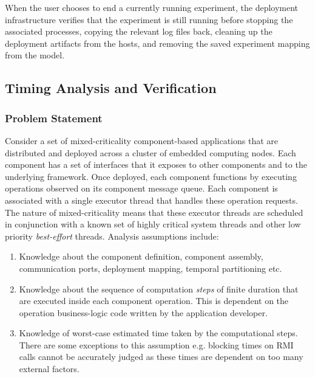 When the user chooses to end a currently running experiment, the
deployment infrastructure verifies that the experiment is still
running before stopping the associated processes, copying the relevant
log files back, cleaning up the deployment artifacts from the hosts,
and removing the saved experiment mapping from the model.

\iffalse

\subsection{Timing Analysis and Verification}
\label{sec:TAV}

\subsubsection{Problem Statement}

Consider a set of mixed-criticality component-based applications that
are distributed and deployed across a cluster of embedded computing
nodes. Each component has a set of interfaces that it exposes to other
components and to the underlying framework. Once deployed, each
component functions by executing operations observed on its component
message queue. Each component is associated with a single executor
thread that handles these operation requests. The nature of
mixed-criticality means that these executor threads are scheduled in
conjunction with a known set of highly critical system threads and
other low priority \emph{best-effort} threads. Analysis assumptions
include:

\begin{enumerate}
	\item Knowledge about the component definition, component
          assembly, communication ports, deployment mapping, temporal
          partitioning etc.
	\item Knowledge about the sequence of computation \emph{steps}
          of finite duration that are executed inside each component
          operation. This is dependent on the operation business-logic
          code written by the application developer.
	\item Knowledge of worst-case estimated time taken by the
          computational steps. There are some exceptions to this
          assumption e.g. blocking times on RMI calls cannot be
          accurately judged as these times are dependent on too many
          external factors.
\end{enumerate}

